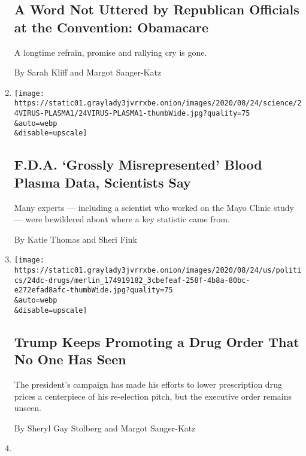\begin{enumerate}
{  \subsection{A Word Not Uttered by Republican Officials at the
  Convention:
  Obamacare}\label{a-word-not-uttered-by-republican-officials-at-the-convention-obamacare}}

  A longtime refrain, promise and rallying cry is gone.

  By Sarah Kliff and Margot Sanger-Katz
\item
  \href{/2020/08/24/health/fda-blood-plasma.html}{}

  \texttt{[image: https://static01.graylady3jvrrxbe.onion/images/2020/08/24/science/24VIRUS-PLASMA1/24VIRUS-PLASMA1-thumbWide.jpg?quality=75\\\&auto=webp\\\&disable=upscale]}

  \hypertarget{fda-grossly-misrepresented-blood-plasma-data-scientists-say}{%
  \subsection{F.D.A. `Grossly Misrepresented' Blood Plasma Data,
  Scientists
  Say}\label{fda-grossly-misrepresented-blood-plasma-data-scientists-say}}

  Many experts --- including a scientist who worked on the Mayo Clinic
  study --- were bewildered about where a key statistic came from.

  By Katie Thomas and Sheri Fink
\item
  \href{/2020/08/24/us/politics/trump-drug-prices.html}{}

  \texttt{[image: https://static01.graylady3jvrrxbe.onion/images/2020/08/24/us/politics/24dc-drugs/merlin\_174919182\_3cbefeaf-258f-4b8a-80bc-e272efad8afc-thumbWide.jpg?quality=75\\\&auto=webp\\\&disable=upscale]}

  \hypertarget{trump-keeps-promoting-a-drug-order-that-no-one-has-seen}{%
  \subsection{Trump Keeps Promoting a Drug Order That No One Has
  Seen}\label{trump-keeps-promoting-a-drug-order-that-no-one-has-seen}}

  The president's campaign has made his efforts to lower prescription
  drug prices a centerpiece of his re-election pitch, but the executive
  order remains unseen.

  By Sheryl Gay Stolberg and Margot Sanger-Katz
\item
  \href{/2020/08/24/upshot/health-care-choice-freedom-confusion.html}{}


\end{enumerate}
